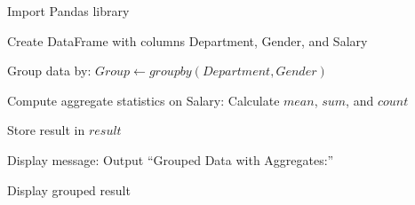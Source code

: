 \begin{algorithm}
\caption{Group DataFrame by Two Columns and Compute Aggregate Statistics}
\begin{algorithmic}[1]

\STATE Import Pandas library

\STATE Create DataFrame with columns Department, Gender, and Salary

\STATE Group data by:
\STATE $Group \gets groupby(Department, Gender)$

\STATE Compute aggregate statistics on Salary:
\STATE Calculate $mean$, $sum$, and $count$

\STATE Store result in $result$

\STATE Display message:
\STATE Output ``Grouped Data with Aggregates:''

\STATE Display grouped result

\end{algorithmic}
\end{algorithm}